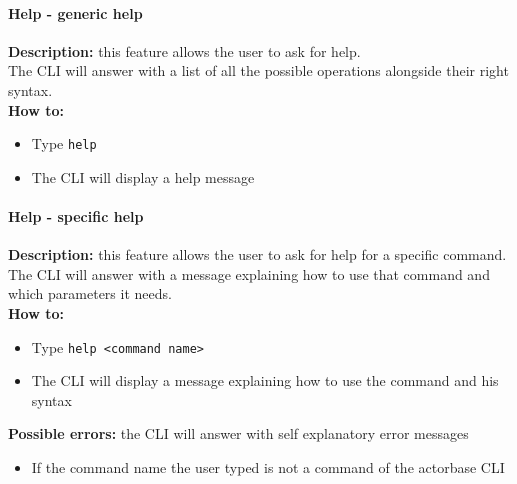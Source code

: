 \documentclass{scalatekids-article}
\begin{document}

\paragraph{Help - generic help}
\label{sec:generichelp}
\textbf{Description:} this feature allows the user to ask for help.\\
The CLI will answer with a list of all the possible operations alongside
their right syntax.\\
\textbf{How to:}
\begin{itemize}
\item Type \texttt{help}
\item The CLI will display a help message
\end{itemize}




\paragraph{Help - specific help}
\label{sec:specifichelp}
\textbf{Description:} this feature allows the user to ask for help for
a specific command.\\
The CLI will answer with a message explaining how to use that command and
which parameters it needs.\\
\textbf{How to:}
\begin{itemize}
\item Type \texttt{help <command name>}
\item The CLI will display a message explaining how to use the command and his syntax
\end{itemize}
\textbf{Possible errors:} the CLI will answer with self explanatory error messages
\begin{itemize}
\item If the command name the user typed is not a command of the actorbase CLI
\end{itemize}
\end{document}
